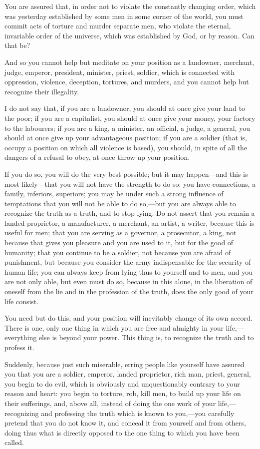 \documentclass{book}
\begin{document}
You are assured that, in order not to violate the constantly changing order, which was yesterday established by some men in some corner of the world, you must commit acts of torture and murder separate men, who violate the eternal, invariable order of the universe, which was established by God, or by reason. Can that be?

And so you cannot help but meditate on your position as a landowner, merchant, judge, emperor, president, minister, priest, soldier, which is connected with oppression, violence, deception, tortures, and murders, and you cannot help but recognize their illegality.

I do not say that, if you are a landowner, you should at once give your land to the poor; if you are a capitalist, you should at once give your money, your factory to the labourers; if you are a king, a minister, an official, a judge, a general, you should at once give up your advantageous position; if you are a soldier (that is, occupy a position on which all violence is based), you should, in spite of all the dangers of a refusal to obey, at once throw up your position.

If you do so, you will do the very best possible; but it may happen—and this is most likely—that you will not have the strength to do so: you have connections, a family, inferiors, superiors; you may be under such a strong influence of temptations that you will not be able to do so,—but you are always able to recognize the truth as a truth, and to stop lying. Do not assert that you remain a landed proprietor, a manufacturer, a merchant, an artist, a writer, because this is useful for men; that you are serving as a governor, a prosecutor, a king, not because that gives you pleasure and you are used to it, but for the good of humanity; that you continue to be a soldier, not because you are afraid of punishment, but because you consider the army indispensable for the security of human life; you can always keep from lying thus to yourself and to men, and you are not only able, but even must do so, because in this alone, in the liberation of oneself from the lie and in the profession of the truth, does the only good of your life consist.

You need but do this, and your position will inevitably change of its own accord. There is one, only one thing in which you are free and almighty in your life,—everything else is beyond your power. This thing is, to recognize the truth and to profess it.

Suddenly, because just such miserable, erring people like yourself have assured you that you are a soldier, emperor, landed proprietor, rich man, priest, general, you begin to do evil, which is obviously and unquestionably contrary to your reason and heart: you begin to torture, rob, kill men, to build up your life on their sufferings, and, above all, instead of doing the one work of your life,—recognizing and professing the truth which is known to you,—you carefully pretend that you do not know it, and conceal it from yourself and from others, doing thus what is directly opposed to the one thing to which you have been called.
\end{document}
